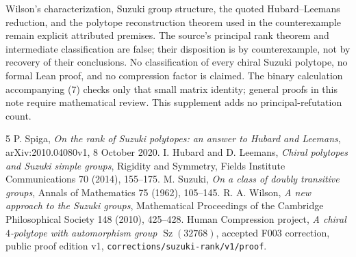 \documentclass[11pt,a4paper]{article}
\newcommand{\Sz}{\operatorname{Sz}}
\begin{document}
Wilson's characterization, Suzuki group structure, the quoted
Hubard--Leemans reduction, and the polytope reconstruction theorem
used in the counterexample remain explicit attributed premises.
The source's principal rank theorem and intermediate classification
are false; their disposition is by counterexample, not by recovery
of their conclusions. No classification of every chiral Suzuki
polytope, no formal Lean proof, and no compression factor is claimed.
The binary calculation accompanying (7) checks only that small
matrix identity; general proofs in this note require mathematical
review. This supplement adds no principal-refutation count.

\begin{thebibliography}{5}
 P. Spiga, \emph{On the rank of Suzuki polytopes:
an answer to Hubard and Leemans}, arXiv:2010.04080v1,
8 October 2020.
 I. Hubard and D. Leemans, \emph{Chiral polytopes and
Suzuki simple groups}, Rigidity and Symmetry, Fields Institute
Communications 70 (2014), 155--175.
 M. Suzuki, \emph{On a class of doubly transitive
groups}, Annals of Mathematics 75 (1962), 105--145.
 R. A. Wilson, \emph{A new approach to the Suzuki
groups}, Mathematical Proceedings of the Cambridge Philosophical
Society 148 (2010), 425--428.
 Human Compression project,
\emph{A chiral $4$-polytope with automorphism group $\Sz(32768)$},
accepted F003 correction, public proof edition v1,
\texttt{corrections/suzuki-rank/v1/proof}.
\end{thebibliography}
\end{document}
